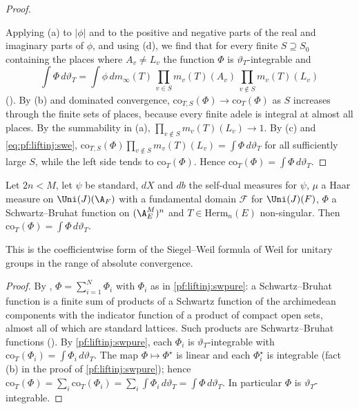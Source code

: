 \begin{proof}
\begin{enumerate}[label=(\alph*)]
\end{enumerate}
Applying (a) to $|\phi|$ and to the positive and negative parts of the real and imaginary parts of $\phi$, and using (d), we find that for every
finite $S\supseteq S_0$ containing the places where $A_v\ne L_v$ the function $\Phi$ is $\vartheta_T$-integrable and
\begin{equation}\label{eq:pf:liftinj:swe}
\int\Phi\,d\vartheta_T=\int\phi\,dm_\infty(T)\,\prod_{v\in S}m_v(T)(A_v)\,\prod_{v\notin S}m_v(T)(L_v)
\end{equation}
(). By (b) and dominated convergence, $\mathrm{co}_{T,S}(\Phi)\to\mathrm{co}_T(\Phi)$
as $S$ increases through the finite sets of places, because every finite adele is integral at almost all places. By the summability in (a),
$\prod_{v\notin S}m_v(T)(L_v)\to1$. By (c) and \eqref{eq:pf:liftinj:swe}, $\mathrm{co}_{T,S}(\Phi)\prod_{v\notin S}m_v(T)(L_v)=\int\Phi\,d\vartheta_T$
for all sufficiently large $S$, while the left side tends to $\mathrm{co}_T(\Phi)$. Hence $\mathrm{co}_T(\Phi)=\int\Phi\,d\vartheta_T$.
\end{proof}

\begin{theorem}\label{pf:liftinj:sw}
Let $2n<M$, let $\psi$ be standard, $dX$ and $db$ the self-dual measures for $\psi$, $\mu$ a Haar measure on $\Uni(J)(\A_F)$ with a fundamental
domain $\mathcal F$ for $\Uni(J)(F)$, $\Phi$ a Schwartz--Bruhat function on $(\A_E^M)^n$ and $T\in\mathrm{Herm}_n(E)$ non-singular. Then
$\mathrm{co}_T(\Phi)=\int\Phi\,d\vartheta_T$.
\end{theorem}

This is the coefficientwise form of the Siegel--Weil formula of Weil \cite{Weil1965} for unitary groups in the range of absolute
convergence.

\begin{proof}
By , $\Phi=\sum_{i=1}^N\Phi_i$ with $\Phi_i$ as in \cref{pf:liftinj:swpure}: a
Schwartz--Bruhat function is a finite sum of products of a Schwartz function of the archimedean components with the indicator function of a
product of compact open sets, almost all of which are standard lattices. Such products are Schwartz--Bruhat functions
(). By \cref{pf:liftinj:swpure}, each $\Phi_i$ is $\vartheta_T$-integrable with
$\mathrm{co}_T(\Phi_i)=\int\Phi_i\,d\vartheta_T$. The map $\Phi\mapsto\Phi^\star$ is linear and each $\Phi_i^\star$ is integrable (fact (b) in the
proof of \cref{pf:liftinj:swpure}); hence $\mathrm{co}_T(\Phi)=\sum_i\mathrm{co}_T(\Phi_i)=\sum_i\int\Phi_i\,d\vartheta_T=\int\Phi\,d\vartheta_T$. In
particular $\Phi$ is $\vartheta_T$-integrable.
\end{proof}

